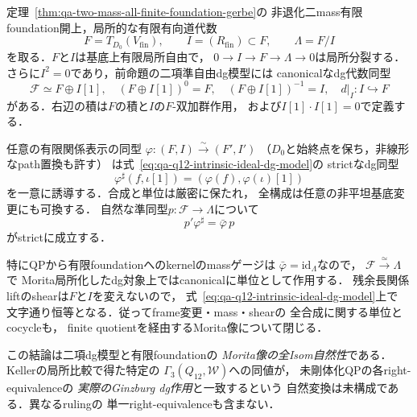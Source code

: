 \begin{proposition}[関係イデアルによる二項dg模型のstrict自然性とmass核の降下]
\label{prop:qa-q12-dg-ideal-presentation-strict-naturality}
定理~\ref{thm:qa-two-mass-all-finite-foundation-gerbe}の
非退化二mass有限foundation開上，局所的な有限有向道代数
\[
 F=T_{D_0}(V_{\mathrm{fin}}),\qquad
 I=(R_{\mathrm{fin}})\subset F,\qquad\Lambda=F/I
\]
を取る．$F$と$I$は基底上有限局所自由で，
$0\to I\to F\to\Lambda\to0$は局所分裂する．
さらに$I^2=0$であり，前命題の二項準自由dg模型には
canonicalなdg代数同型
\[
 \boxed{\qquad
 \mathscr F \simeq F\oplus I[1],
 \quad (F\oplus I[1])^0=F,\quad
 (F\oplus I[1])^{-1}=I,\quad
 d|_I:I\hookrightarrow F
 \qquad}
 \tag{ID}\label{eq:qa-q12-intrinsic-ideal-dg-model}
\]
がある．右辺の積は$F$の積と$I$の$F$-双加群作用，
および$I[1]\cdot I[1]=0$で定義する．

任意の有限関係表示の同型
$\varphi:(F,I)\xrightarrow{\sim}(F',I')$
（$D_0$と始終点を保ち，非線形なpath置換も許す）
は式~\eqref{eq:qa-q12-intrinsic-ideal-dg-model}の
strictなdg同型
\[
 \varphi^\sharp(f,\iota[1])
   =(\varphi(f),\varphi(\iota)[1])
 \tag{IF}\label{eq:qa-q12-ideal-dg-functoriality}
\]
を一意に誘導する．合成と単位は厳密に保たれ，
全構成は任意の非平坦基底変更にも可換する．
自然な準同型$p:\mathscr F\to\Lambda$について
\[
 p'\varphi^\sharp=\bar\varphi\,p
 \tag{IQ}\label{eq:qa-q12-ideal-dg-quotient-naturality}
\]
がstrictに成立する．

特にQPから有限foundationへのkernelのmassゲージは
$\bar\varphi=\mathrm{id}_\Lambda$なので，
$\mathscr F\xrightarrow{\simeq}\Lambda$で
Morita局所化したdg対象上ではcanonicalに単位として作用する．
残余長関係liftのshearは$F$と$I$を変えないので，
式~\eqref{eq:qa-q12-intrinsic-ideal-dg-model}上で
文字通り恒等となる．従ってframe変更・mass・shearの
全合成に関する単位とcocycleも，
finite quotientを経由するMorita像について閉じる．

この結論は二項dg模型と有限foundationの
\emph{Morita像の全Isom自然性}である．
Kellerの局所比較で得た特定の
$\Gamma_3(Q_{12},\mathcal W)$への同値が，
未剛体化QPの各right-equivalenceの
\emph{実際のGinzburg dg作用}と一致するという
自然変換は未構成である．異なるrulingの
単一right-equivalenceも含まない．
\end{proposition}
